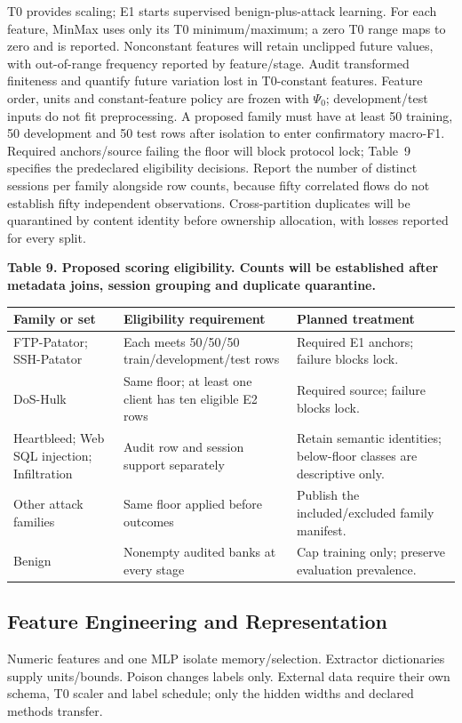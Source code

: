 \documentclass[10pt,a4paper]{article}
\begin{document}
T0 provides scaling; E1 starts supervised benign-plus-attack learning. For each feature, MinMax uses only its T0 minimum/maximum; a zero T0 range maps to zero and is reported. Nonconstant features will retain unclipped future values, with out-of-range frequency reported by feature/stage. Audit transformed finiteness and quantify future variation lost in T0-constant features. Feature order, units and constant-feature policy are frozen with $\Psi_0$; development/test inputs do not fit preprocessing. A proposed family must have at least 50 training, 50 development and 50 test rows after isolation to enter confirmatory macro-F1. Required anchors/source failing the floor will block protocol lock; Table~9 specifies the predeclared eligibility decisions. Report the number of distinct sessions per family alongside row counts, because fifty correlated flows do not establish fifty independent observations. Cross-partition duplicates will be quarantined by content identity before ownership allocation, with losses reported for every split.


\centering\footnotesize
\par\textbf{Table 9. Proposed scoring eligibility. Counts will be established after metadata joins, session grouping and duplicate quarantine.}\par


\begin{longtable}{p{3.0cm}p{2.9cm}l}
\toprule
Family or set & Eligibility requirement & Planned treatment\\
\midrule
FTP-Patator; SSH-Patator & Each meets 50/50/50 train/development/test rows & Required E1 anchors; failure blocks lock.\\
DoS-Hulk & Same floor; at least one client has ten eligible E2 rows & Required source; failure blocks lock.\\
Heartbleed; Web SQL injection; Infiltration & Audit row and session support separately & Retain semantic identities; below-floor classes are descriptive only.\\
Other attack families & Same floor applied before outcomes & Publish the included/excluded family manifest.\\
Benign & Nonempty audited banks at every stage & Cap training only; preserve evaluation prevalence.\\
\bottomrule
\end{longtable}


\subsection{Feature Engineering and Representation}
Numeric features and one MLP isolate memory/selection. Extractor dictionaries supply units/bounds. Poison changes labels only.
External data require their own schema, T0 scaler and label schedule; only the hidden widths and declared methods transfer.
\end{document}
